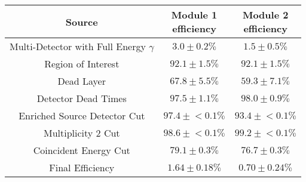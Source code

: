 \begin{tabular}{|c|c|c|}
\hline
  Source & \makecell{Module 1\\efficiency} & \makecell{Module 2\\efficiency} \\
\hline
  \makecell{Multi-Detector with\\Full Energy $\gamma$} & $3.0 \pm 0.2\%$ & $1.5 \pm 0.5\%$ \\
  Region of Interest & $92.1 \pm 1.5\%$ & $92.1 \pm 1.5\%$ \\
  Dead Layer & $67.8 \pm 5.5\%$ & $59.3 \pm 7.1\%$ \\
  Detector Dead Times & $97.5 \pm 1.1\%$ & $98.0 \pm 0.9\%$ \\
  Enriched Source Detector Cut & $97.4 \pm{}<\!0.1\%$ & $93.4 \pm{}<\!0.1\%$ \\
  Multiplicity 2 Cut & $98.6 \pm{}<\!0.1\%$ & $99.2 \pm{}<\!0.1\%$ \\
  Coincident Energy Cut & $79.1 \pm 0.3\%$ & $76.7 \pm 0.3\%$ \\
  \hline Final Efficiency & $1.64 \pm 0.18\%$ & $0.70 \pm 0.24\%$ \\
\hline
\end{tabular}
